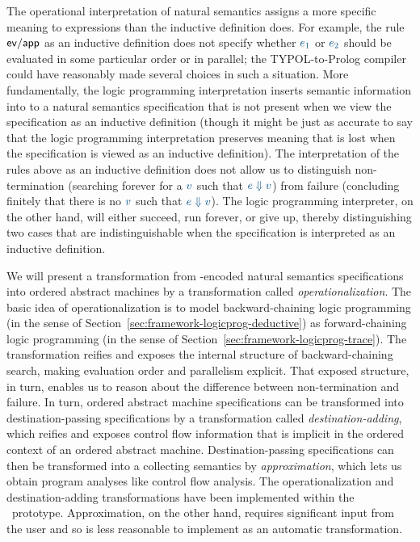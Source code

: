 The operational interpretation of natural semantics assigns a more
specific meaning to expressions than the inductive definition does.
For example, the rule ${\sf ev/app}$ as an inductive definition does
not specify whether $\obj{e_1}$ or $\obj{e_2}$ should be evaluated in
some particular order or in parallel; the TYPOL-to-Prolog compiler
could have reasonably made several choices in such a situation. More
fundamentally, the logic programming interpretation inserts semantic
information into to a natural semantics specification that is not
present when we view the specification as an inductive definition
(though it might be just as accurate to say that the logic programming
interpretation preserves meaning that is lost when the specification
is viewed as an inductive definition). The interpretation of the rules
above as an inductive definition does not allow us to distinguish
non-termination (searching forever for a $\obj{v}$ such that $\obj{e
  \Downarrow v}$) from failure (concluding finitely that there is no
$\obj{v}$ such that $\obj{e \Downarrow v}$).  The logic programming
interpreter, on the other hand, will either succeed, run forever, or
give up, thereby distinguishing two cases that are indistinguishable
when the specification is interpreted as an inductive definition.

We will present a transformation from \sls-encoded natural semantics
specifications into ordered abstract machines by a transformation
called {\it operationalization}. The basic idea of operationalization
is to model backward-chaining logic programming (in the sense of
Section~\ref{sec:framework-logicprog-deductive}) as forward-chaining
logic programming (in the sense of
Section~\ref{sec:framework-logicprog-trace}). The transformation
reifies and exposes the internal structure of backward-chaining
search, making evaluation order and parallelism explicit. That exposed
structure, in turn, enables us to reason about the difference between
non-termination and failure. In turn, ordered abstract machine
specifications can be transformed into destination-passing
specifications by a transformation called {\it destination-adding},
which reifies and exposes control flow information that is implicit in
the ordered context of an ordered abstract machine.
Destination-passing specifications can then be transformed into a
collecting semantics by {\it approximation}, which lets us obtain
program analyses like control flow analysis. The operationalization
and destination-adding transformations have been implemented within
the \sls~prototype. Approximation, on the other hand, requires
significant input from the user and so is less reasonable to implement
as an automatic transformation.


